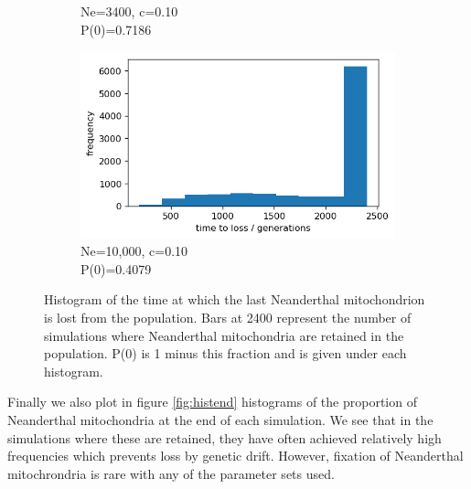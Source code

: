 \documentclass{article}
\begin{document}
\begin{figure}[h]
\begin{subfigure}[t]{0.24\linewidth}
		\caption{Ne=3400, c=0.10\\P(0)=0.7186}
	\end{subfigure}
	\hspace{0.0\linewidth}
	\begin{subfigure}[t]{0.24\linewidth}
		\centering
		\includegraphics[width = 1.0\linewidth, trim={0 0 0 0}, clip=true]{figures/Ne10000_c1_histloss.png}
		\caption{Ne=10,000, c=0.10\\P(0)=0.4079}
	\end{subfigure}
\caption{Histogram of the time at which the last Neanderthal mitochondrion is lost from the population. Bars at 2400 represent the number of simulations where Neanderthal mitochondria are retained in the population. P(0) is 1 minus this fraction and is given under each histogram.}
\label{fig:histcourse}
\end{figure}

Finally we also plot in figure \ref{fig:histend} histograms of the proportion of Neanderthal mitochondria at the end of each simulation. We see that in the simulations where these are retained, they have often achieved relatively high frequencies which prevents loss by genetic drift. However, fixation of Neanderthal mitochrondria is rare with any of the parameter sets used.
\end{document}
